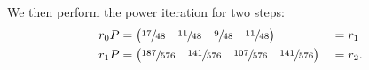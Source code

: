 We then perform the power iteration for two steps:
%
\begin{alignat*}{2}
  r_0 P &= 
    \begin{pmatrix}
      \sfrac{17}{48}&\sfrac{11}{48}&\sfrac{9}{48}&\sfrac{11}{48}
    \end{pmatrix} &&= r_1 \\
  r_1 P &= 
    \begin{pmatrix}
      \sfrac{187}{576}&\sfrac{141}{576}&\sfrac{107}{576}&\sfrac{141}{576}
    \end{pmatrix} &&= r_2.
\end{alignat*}